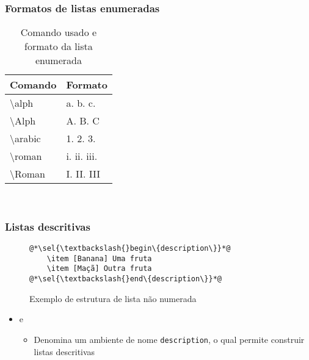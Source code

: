 \begin{frame}[fragile] \frametitle{Formatos de listas enumeradas}
\begin{table}[!h]
	\centering
	\caption{Comando usado e formato da lista enumerada}
	\begin{tabular}{l|l}		
	\hline
		\textbf{Comando}       & \textbf{Formato} \\ \hline
		\textbackslash{}alph   & a. b. c.         \\ \hline
		\textbackslash{}Alph   & A. B. C          \\ \hline
		\textbackslash{}arabic & 1. 2. 3.         \\ \hline
		\textbackslash{}roman  & i. ii. iii.      \\ \hline
		\textbackslash{}Roman  & I. II. III       \\ \hline
	\end{tabular}
	\\ \vspace{0.3cm} \ownsrc
\end{table}
\end{frame}

\begin{frame}[fragile] \frametitle{Listas descritivas}
\begin{figure}[!t]
\caption{Exemplo de estrutura de lista não numerada}
\begin{lstlisting}
@*\sel{\textbackslash{}begin\{description\}}*@
	\item [Banana] Uma fruta
	\item [Maçã] Outra fruta
@*\sel{\textbackslash{}end\{description\}}*@
\end{lstlisting}
\ownsrc
\end{figure}

\begin{itemize}
	\item {} e 
	\begin{itemize}
		\item Denomina um ambiente de nome \texttt{description}, o qual permite construir listas descritivas
	\end{itemize}
\end{itemize}
\end{frame}


